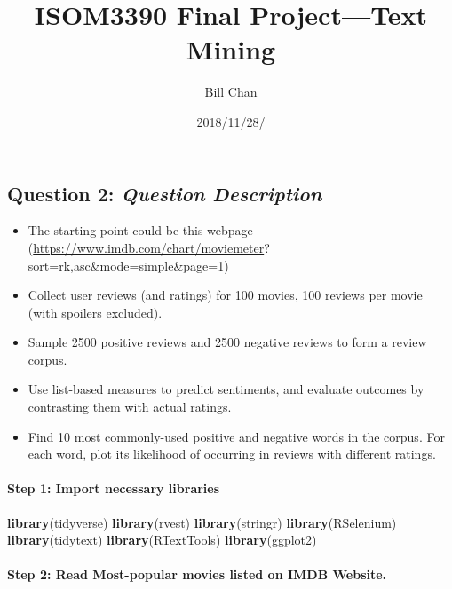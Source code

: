\documentclass[]{article}
\title{ISOM3390 Final Project---Text Mining}
\author{Bill Chan}
\date{2018/11/28/}
\newenvironment{Shaded}{\begin{snugshade}}{\end{snugshade}}
\newcommand{\KeywordTok}[1]{\textcolor[rgb]{0.13,0.29,0.53}{\textbf{#1}}}
\newcommand{\NormalTok}[1]{#1}
\providecommand{\tightlist}{%
  \setlength{\itemsep}{0pt}\setlength{\parskip}{0pt}}
\let\oldparagraph\paragraph
\renewcommand{\paragraph}[1]{\oldparagraph{#1}\mbox{}}
\begin{document}
\maketitle

\subsection{\texorpdfstring{Question 2: \emph{Question
Description}}{Question 2: Question Description}}\label{question-2-question-description}

\begin{itemize}
\tightlist
\item
  The starting point could be this webpage
  (\url{https://www.imdb.com/chart/moviemeter}?
  sort=rk,asc\&mode=simple\&page=1)
\item
  Collect user reviews (and ratings) for 100 movies, 100 reviews per
  movie (with spoilers excluded).
\item
  Sample 2500 positive reviews and 2500 negative reviews to form a
  review corpus.
\item
  Use list-based measures to predict sentiments, and evaluate outcomes
  by contrasting them with actual ratings.
\item
  Find 10 most commonly-used positive and negative words in the corpus.
  For each word, plot its likelihood of occurring in reviews with
  different ratings.
\end{itemize}

\paragraph{Step 1: Import necessary
libraries}\label{step-1-import-necessary-libraries}

\begin{Shaded}
\begin{Highlighting}[]
\KeywordTok{library}\NormalTok{(tidyverse)}
\KeywordTok{library}\NormalTok{(rvest)}
\KeywordTok{library}\NormalTok{(stringr)}
\KeywordTok{library}\NormalTok{(RSelenium)}
\KeywordTok{library}\NormalTok{(tidytext)}
\KeywordTok{library}\NormalTok{(RTextTools)}
\KeywordTok{library}\NormalTok{(ggplot2)}
\end{Highlighting}
\end{Shaded}

\paragraph{Step 2: Read Most-popular movies listed on IMDB
Website.}\label{step-2-read-most-popular-movies-listed-on-imdb-website.}
\end{document}

